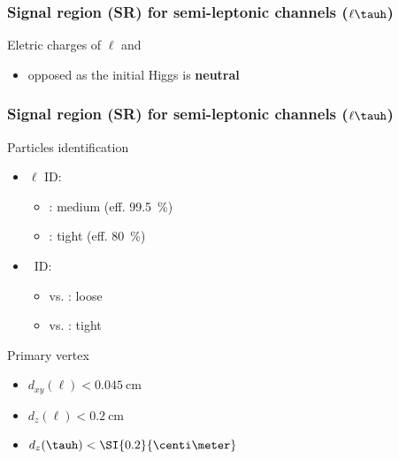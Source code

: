 \begin{frame}
\frametitle{Signal region (SR) for semi-leptonic channels ($\ell\tauh$)}

\begin{block}{Eletric charges of $\ell$ and \tauh}
\begin{itemize}
\item opposed as the initial Higgs is \textbf{neutral}
\end{itemize}
\begin{center}

\end{center}
\end{block}

\end{frame}
\begin{frame}
\frametitle{Signal region (SR) for semi-leptonic channels ($\ell\tauh$)}

\begin{block}{Particles identification}
\begin{multicols}{2}
\begin{itemize}
\item $\ell$ ID:
\begin{itemize}
\item \muon: medium (eff. \SI{99.5}{\%})
\item \ele: tight (eff. \SI{80}{\%})
\end{itemize}
\item \tauh\ ID:
\begin{itemize}
\item vs. \muon: loose
\item vs. \ele: tight
\end{itemize}
\end{itemize}
\end{multicols}
\end{block}

\pause
\begin{block}{Primary vertex}
\begin{minipage}{.3\linewidth}
\begin{itemize}
\item $d_{xy}(\ell) < \SI{0.045}{\centi\meter}$
\item $d_{z}(\ell) < \SI{0.2}{\centi\meter}$
\item $d_{z}(\tauh) < \SI{0.2}{\centi\meter}$
\end{itemize}
\end{minipage}
\begin{minipage}{.65\linewidth}
\begin{center}
\begin{tikzpicture}[scale=1]


\end{tikzpicture}
\end{center}
\end{minipage}
\end{block}
\end{frame}

